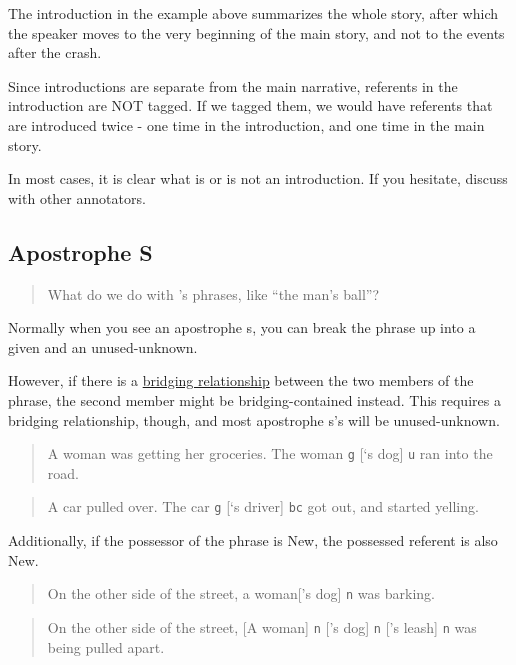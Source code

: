 \documentclass[
]{book}
\begin{document}
The introduction in the example above summarizes the whole story,
after which the speaker moves to the very beginning of the main story,
and not to the events after the crash.

Since introductions are separate from the main narrative,
referents in the introduction are NOT tagged. If we tagged them,
we would have referents that are introduced twice - one time in the introduction,
and one time in the main story.

In most cases, it is clear what is or is not an introduction.
If you hesitate, discuss with other annotators.

\hypertarget{apostrophe-s}{%
\subsection{Apostrophe S}\label{apostrophe-s}}

\begin{quote}
What do we do with 's phrases, like ``the man's ball''?
\end{quote}

Normally when you see an apostrophe s, you can break the phrase up into a given and an unused-unknown.

However, if there is a \protect\hyperlink{bridging-relationships}{bridging relationship} between the two members of the phrase, the second member might be bridging-contained instead.
This requires a bridging relationship, though, and most apostrophe s's will be unused-unknown.

\begin{quote}
A woman was getting her groceries.
The woman \texttt{g} {[}`s dog{]} \texttt{u} ran into the road.
\end{quote}

\begin{quote}
A car pulled over.
The car \texttt{g} {[}`s driver{]} \texttt{bc} got out, and started yelling.
\end{quote}

Additionally, if the possessor of the phrase is New,
the possessed referent is also New.

\begin{quote}
On the other side of the street, a woman{[}'s dog{]} \texttt{n} was barking.
\end{quote}

\begin{quote}
On the other side of the street,
{[}A woman{]} \texttt{n} {[}'s dog{]} \texttt{n} {[}'s leash{]} \texttt{n} was being pulled apart.
\end{quote}
\end{document}
